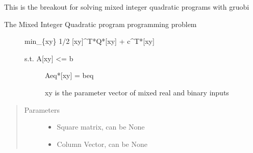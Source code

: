 \documentclass[letterpaper,10pt,english]{sphinxmanual}
\begin{document}
\begin{fulllineitems}
\label{\detokenize{ppopt.solver_interface:ppopt.solver_interface.gurobi_solver_interface.solve_qp_gurobi}}
\sphinxAtStartPar
This is the breakout for solving mixed integer quadratic programs with gruobi
\begin{description}
\item[{The Mixed Integer Quadratic program programming problem}] \leavevmode
\sphinxAtStartPar
min\_\{xy\} 1/2 {[}xy{]}\textasciicircum{}T*Q*{[}xy{]} + c\textasciicircum{}T*{[}xy{]}
\begin{description}
\item[{s.t.   A{[}xy{]} \textless{}= b}] \leavevmode
\sphinxAtStartPar
Aeq*{[}xy{]} = beq

\sphinxAtStartPar
xy is the parameter vector of mixed real and binary inputs

\end{description}

\end{description}
\begin{quote}\begin{description}
\item[{Parameters}] \leavevmode\begin{itemize}
\item {} 
\sphinxAtStartPar
{} \textendash{} Square matrix, can be None

\item {} 
\sphinxAtStartPar
{} \textendash{} Column Vector, can be None


\end{itemize}
\end{description}
\end{quote}
\end{fulllineitems}
\end{document}
